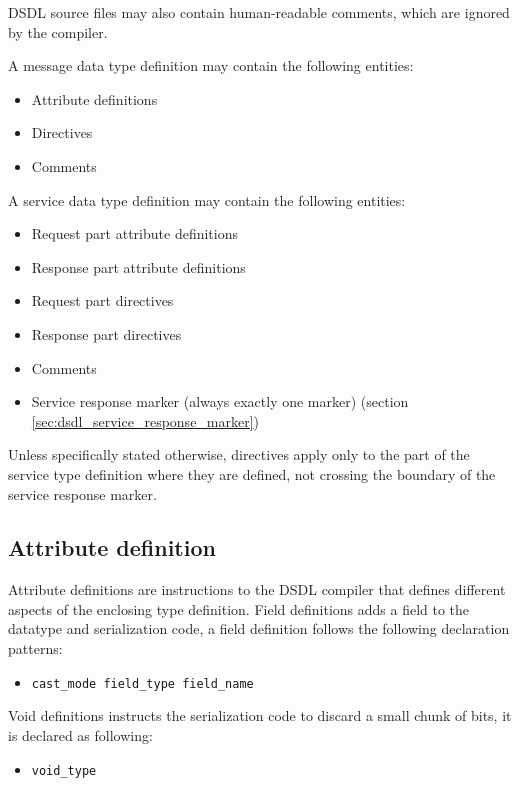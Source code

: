 DSDL source files may also contain human-readable comments, which are ignored by the compiler.

A message data type definition may contain the following entities:

\begin{itemize}
    \item Attribute definitions
    \item Directives
    \item Comments
\end{itemize}

A service data type definition may contain the following entities:

\begin{itemize}
    \item Request part attribute definitions
    \item Response part attribute definitions
    \item Request part directives
    \item Response part directives
    \item Comments
    \item Service response marker (always exactly one marker) (section \ref{sec:dsdl_service_response_marker})
\end{itemize}

Unless specifically stated otherwise,
directives apply only to the part of the service type definition where they are defined,
not crossing the boundary of the service response marker.

\subsection{Attribute definition}
Attribute definitions are instructions to the DSDL compiler
that defines different aspects of the enclosing type definition.
Field definitions adds a field to the datatype and serialization code,
a field definition follows the following declaration patterns:
\begin{itemize}
    \item \verb|cast_mode field_type field_name|
\end{itemize}

Void definitions instructs the serialization code to discard a small chunk of bits, it is declared as following:
\begin{itemize}
    \item \verb|void_type|
\end{itemize}


